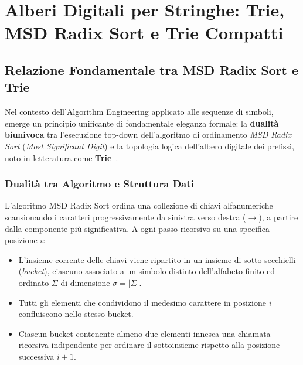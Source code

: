 \chapter{Alberi Digitali per Stringhe: Trie, MSD Radix Sort e Trie Compatti}
\label{chap:trie-compatti-msd-radix-sort-autocompletamento}

\FloatBarrier
\section{Relazione Fondamentale tra MSD Radix Sort e Trie}
\label{sec:dualita-msd-radix-trie}

Nel contesto dell'Algorithm Engineering applicato alle sequenze di simboli, emerge un principio unificante di fondamentale eleganza formale: la \textbf{dualit\`a biunivoca} tra l'esecuzione top-down dell'algoritmo di ordinamento \textit{MSD Radix Sort} (\textit{Most Significant Digit}) e la topologia logica dell'albero digitale dei prefissi, noto in letteratura come \textbf{Trie}~\cite{fredkin1960, knuth1998vol3}.

\FloatBarrier
\subsection{Dualità tra Algoritmo e Struttura Dati}
\label{subsec:dualita-algoritmo-struttura}

L'algoritmo MSD Radix Sort ordina una collezione di chiavi alfanumeriche scansionando i caratteri progressivamente da sinistra verso destra ($\rightarrow$), a partire dalla componente pi\`u significativa. A ogni passo ricorsivo su una specifica posizione $i$:
\begin{itemize}
  \item L'insieme corrente delle chiavi viene ripartito in un insieme di sotto-secchielli (\textit{bucket}), ciascuno associato a un simbolo distinto dell'alfabeto finito ed ordinato $\Sigma$ di dimensione $\sigma = |\Sigma|$.
  \item Tutti gli elementi che condividono il medesimo carattere in posizione $i$ confluiscono nello stesso bucket.
  \item Ciascun bucket contenente almeno due elementi innesca una chiamata ricorsiva indipendente per ordinare il sottoinsieme rispetto alla posizione successiva $i+1$.
\end{itemize}


